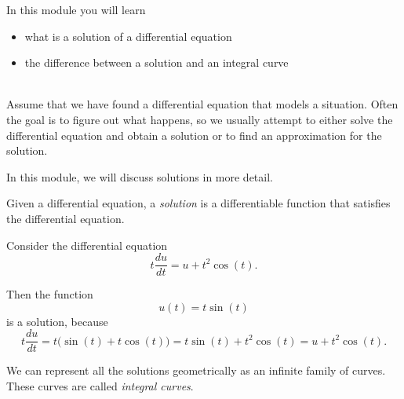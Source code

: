 In this module you will learn
\begin{itemize}
	\item what is a solution of a differential equation
	\item the difference between a solution and an integral curve
\end{itemize}

\hfill \\[-10pt]

Assume that we have found a differential equation that models a situation.
Often the goal is to figure out what happens, so we usually attempt to either solve the differential equation and obtain a solution or to find an approximation for the solution.

In this module, we will discuss solutions in more detail.

\begin{definition}[Solution]
	Given a differential equation, a \emph{solution} is a differentiable function that satisfies the differential equation.
\end{definition}

\begin{example}
Consider the differential equation
$$
t \frac{du}{dt} = u + t^2 \cos(t).
$$

Then the function 
$$
u(t) = t\sin(t)
$$
is a solution, because
$$
t \frac{du}{dt} = t \big( \sin(t) + t \cos(t) \big) = t \sin(t) + t^2 \cos (t) = u + t^2 \cos(t).
$$
\end{example}



\begin{definition}
	We can represent all the solutions geometrically as an infinite family of curves. These curves are called \emph{integral curves}.
\end{definition}

